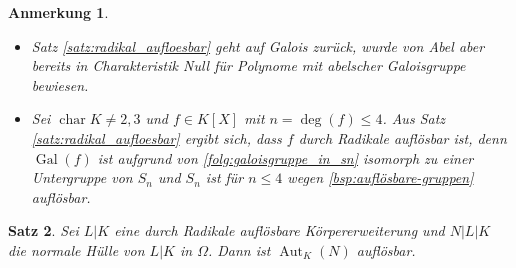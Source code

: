 \documentclass[a4paper, twoside, 11pt, ngerman]{report}
\DeclareMathOperator{\charact}{char}
\DeclareMathOperator{\Gal}{Gal}
\theoremstyle{definistyle}
\newtheorem{satz}{Satz}[section]
\newtheorem{anm}[satz]{Anmerkung}
\theoremstyle{remark}
\begin{document}
\begin{anm}
\begin{itemize}
\item Satz \ref{satz:radikal_aufloesbar} geht auf Galois zurück, wurde von Abel aber bereits in Charakteristik Null für Polynome mit abelscher Galoisgruppe bewiesen.
\item Sei $\charact K \neq 2, 3$ und $f \in K[X]$ mit $n = \deg(f) \leq 4$. 
Aus Satz \ref{satz:radikal_aufloesbar} ergibt sich, dass $f$ durch Radikale auflösbar ist, denn $\Gal(f)$ ist aufgrund von \ref{folg:galoisgruppe_in_sn} isomorph zu einer Untergruppe von $S_n$ und $S_n$ ist für $n \leq 4$ wegen \ref{bsp:auflösbare-gruppen} auflösbar. 
\end{itemize}
\end{anm}

\begin{satz}\label{satz:radikalaufl_gal_aufl}
Sei $L|K$ eine durch Radikale auflösbare Körpererweiterung und $N|L|K$ die normale Hülle von $L|K$ in $\Omega$. Dann ist $\operatorname{Aut}_K(N)$ auflösbar.
\end{satz}
\end{document}
